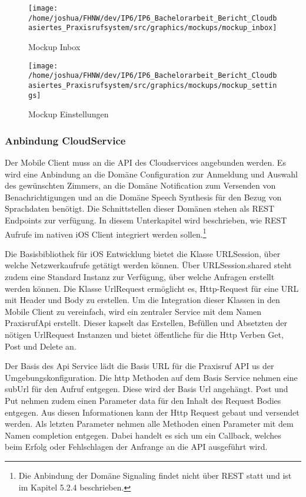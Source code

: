 \begin{figure}[h]
    \centering
    \begin{minipage}[b]{0.4\textwidth}
        \texttt{[image: /home/joshua/FHNW/dev/IP6/IP6\_Bachelorarbeit\_Bericht\_Cloudbasiertes\_Praxisrufsystem/src/graphics/mockups/mockup\_inbox]}
        \caption{Mockup Inbox}
    \end{minipage}
    \hfill
    \begin{minipage}[b]{0.4\textwidth}
        \texttt{[image: /home/joshua/FHNW/dev/IP6/IP6\_Bachelorarbeit\_Bericht\_Cloudbasiertes\_Praxisrufsystem/src/graphics/mockups/mockup\_settings]}
        \caption{Mockup Einstellungen}
    \end{minipage}\label{fig:Mockups-Inbox-Settings}
\end{figure}


\subsubsection{Anbindung CloudService}

Der Mobile Client muss an die API des Cloudservices angebunden werden.
Es wird eine Anbindung an die Domäne Configuration zur Anmeldung und Auswahl des gewünschten Zimmers, an die Domäne Notification zum Versenden von Benachrichtigungen und an die Domäne Speech Synthesis für den Bezug von Sprachdaten benötigt.
Die Schnittstellen dieser Domänen stehen als REST Endpoints zur verfügung.
In diesem Unterkapitel wird beschrieben, wie REST Aufrufe im nativen iOS Client integriert werden sollen.\footnote{Die Anbindung der Domäne Signaling findet nicht über REST statt und ist im Kapitel 5.2.4 beschrieben.}

Die Basisbibliothek für iOS Entwicklung bietet die Klasse URLSession, über welche Netzwerkaufrufe getätigt werden können.
Über URLSession.shared steht zudem eine Standard Instanz zur Verfügung, über welche Anfragen erstellt werden können.\cite{ios_urlsession}
Die Klasse UrlRequest ermöglicht es, Http-Request für eine URL mit Header und Body zu erstellen.\cite{ios_urlrequest}
Um die Integration dieser Klassen in den Mobile Client zu vereinfach, wird ein zentraler Service mit dem Namen PraxisrufApi erstellt.
Dieser kapselt das Erstellen, Befüllen und Absetzten der nötigen UrlRequest Instanzen und bietet öffentliche für die Http Verben Get, Post und Delete an.

Der Basis des Api Service lädt die Basis URL für die Praxisruf API us der Umgebungskonfiguration.
Die http Methoden auf dem Basis Service nehmen eine subUrl für den Aufruf entgegen.
Diese wird der Basis Url angehängt.
Post und Put nehmen zudem einen Parameter data für den Inhalt des Request Bodies entgegen.
Aus diesen Informationen kann der Http Request gebaut und versendet werden.
Als letzten Parameter nehmen alle Methoden einen Parameter mit dem Namen completion entgegen.
Dabei handelt es sich um ein Callback, welches beim Erfolg oder Fehlschlagen der Anfrange an die API ausgeführt wird.

